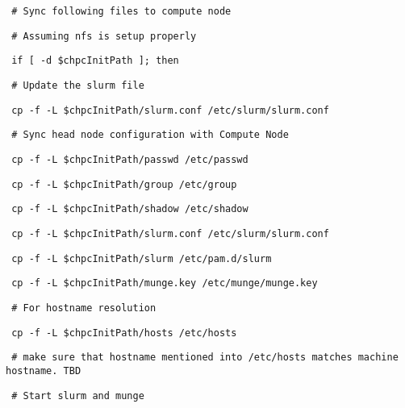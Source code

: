 \begin{section}
\begin{bash}\texttt{\small{ \# Sync following files to compute node}}\end{bash}
\begin{bash}\texttt{\small{ \# Assuming nfs is setup properly}}\end{bash}
\begin{bash}\texttt{\small{ if [ -d \$chpcInitPath ]; then}}\end{bash}
\begin{bash}\texttt{\small{     \# Update the slurm file}}\end{bash}
\begin{bash}\texttt{\small{     cp -f -L \$chpcInitPath/slurm.conf /etc/slurm/slurm.conf}}\end{bash}
\begin{bash}\texttt{\small{     \# Sync head node configuration with Compute Node}}\end{bash}
\begin{bash}\texttt{\small{     cp -f -L \$chpcInitPath/passwd /etc/passwd}}\end{bash}
\begin{bash}\texttt{\small{     cp -f -L \$chpcInitPath/group /etc/group}}\end{bash}
\begin{bash}\texttt{\small{     cp -f -L \$chpcInitPath/shadow /etc/shadow}}\end{bash}
\begin{bash}\texttt{\small{     cp -f -L \$chpcInitPath/slurm.conf /etc/slurm/slurm.conf}}\end{bash}
\begin{bash}\texttt{\small{     cp -f -L \$chpcInitPath/slurm /etc/pam.d/slurm}}\end{bash}
\begin{bash}\texttt{\small{     cp -f -L \$chpcInitPath/munge.key /etc/munge/munge.key}}\end{bash}
\begin{bash}\texttt{\small{     \# For hostname resolution}}\end{bash}
\begin{bash}\texttt{\small{     cp -f -L \$chpcInitPath/hosts /etc/hosts}}\end{bash}
\begin{bash}\texttt{\small{     \# make sure that hostname mentioned into /etc/hosts matches machine hostname. TBD}}\end{bash}
\begin{bash}\texttt{\small{     \# Start slurm and munge }}\end{bash}

\end{section}
